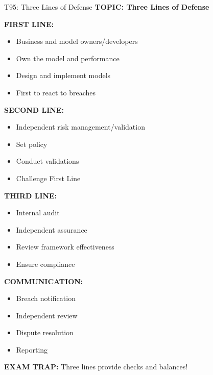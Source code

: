 \documentclass[8pt]{beamer}
\begin{document}
	\begin{frame}{T95: Three Lines of Defense}
		\fontsize{6.5}{7.5}\selectfont
		\textbf{TOPIC: Three Lines of Defense}
		
		\vspace{0.1cm}
		\textbf{FIRST LINE:}
		\begin{itemize}
			\item Business and model owners/developers
			\item Own the model and performance
			\item Design and implement models
			\item First to react to breaches
		\end{itemize}
		
		\vspace{0.1cm}
		\textbf{SECOND LINE:}
		\begin{itemize}
			\item Independent risk management/validation
			\item Set policy
			\item Conduct validations
			\item Challenge First Line
		\end{itemize}
		
		\vspace{0.1cm}
		\textbf{THIRD LINE:}
		\begin{itemize}
			\item Internal audit
			\item Independent assurance
			\item Review framework effectiveness
			\item Ensure compliance
		\end{itemize}
		
		\vspace{0.1cm}
		\textbf{COMMUNICATION:}
		\begin{itemize}
			\item Breach notification
			\item Independent review
			\item Dispute resolution
			\item Reporting
		\end{itemize}
		
		\textcolor{myred}{\textbf{EXAM TRAP:}} Three lines provide \textcolor{myblue}{checks and balances}!
	\end{frame}
	
\end{document}
